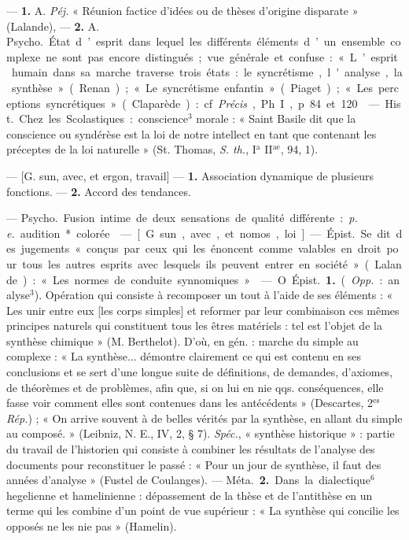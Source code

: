 \begin{itemize}[leftmargin=1cm, label=, itemsep=1pt]
 — {\bf 1.} A. {\it Péj.} « Réunion
factice d’idées ou de thèses d’origine
disparate » (Lalande), — {\bf 2.} A.
\si{Psycho.} État d’esprit dans lequel
les différents éléments d’un ensemble complexe ne sont pas encore
distingués; vue générale et confuse :
« L’esprit humain dans sa marche
traverse trois états : le syncrétisme,
l'analyse, la synthèse » (Renan) ;
« Le syncrétisme enfantin » (Piaget) ;
« Les perceptions syncrétiques »
(Claparède) : cf. {\it Précis}, Ph. I, p. 84
et 120.

 — \si{Hist.} Chez les Scolastiques : conscience$^3$ morale : « Saint
Basile dit que la conscience ou syndérèse est la loi de notre intellect en
tant que contenant les préceptes de
la loi naturelle » (St. Thomas, {\it S. th.},
I$^\text{a}$ II$^\text{ae}$, 94, 1).

 — [G. sun, avec, et ergon, travail] — {\bf 1.} Association dynamique
de plusieurs fonctions. — {\bf 2.} Accord
des tendances.

 — \si{Psycho.} Fusion intime
de deux sensations de qualité différente : {\it p. e.} audition* colorée.

 — [G. sun, avec, et nomos,
loi] — \si{Épist.} Se dit des jugements
« conçus par ceux qui les énoncent
comme valables en droit pour tous
les autres esprits avec lesquels ils
peuvent entrer en société » (Lalande) : « Les normes de conduite
synnomiques. »

 — O. \si{Épist.} {\bf 1.} ({\it Opp.} : analyse$^3$). Opération qui consiste à recomposer un tout à l’aide de ses
éléments : « Les unir entre eux [les
corps simples] et reformer par leur
combinaison ces mêmes principes
naturels qui constituent tous les
êtres matériels : tel est l’objet de la
synthèse chimique » (M. Berthelot).
D'où, en gén. : marche du simple au
complexe : « La synthèse... démontre
clairement ce qui est contenu en ses
conclusions et se sert d’une longue
suite de définitions, de demandes,
d’axiomes, de théorèmes et de
problèmes, afin que, si on lui en
nie qqs. conséquences, elle fasse
voir comment elles sont contenues
dans les antécédents » (Descartes,
2$^\text{es}$ {\it Rép.}) ; « On arrive souvent à de
belles vérités par la synthèse, en
allant du simple au composé. »
(Leibniz, N. E., IV, 2, § 7). {\it Spéc.},
« synthèse historique » : partie du
travail de l’historien qui consiste à
combiner les résultats de l’analyse
des documents pour reconstituer le
passé : « Pour un jour de synthèse,
il faut des années d'analyse » (Fustel
de Coulanges). — \si{Méta.} {\bf 2.} Dans la
dialectique$^6$ hegelienne et hamelinienne : dépassement de la thèse et
de l’antithèse en un terme qui les
combine d’un point de vue supérieur : « La synthèse qui concilie les
opposés ne les nie pas » (Hamelin).


\end{itemize}
